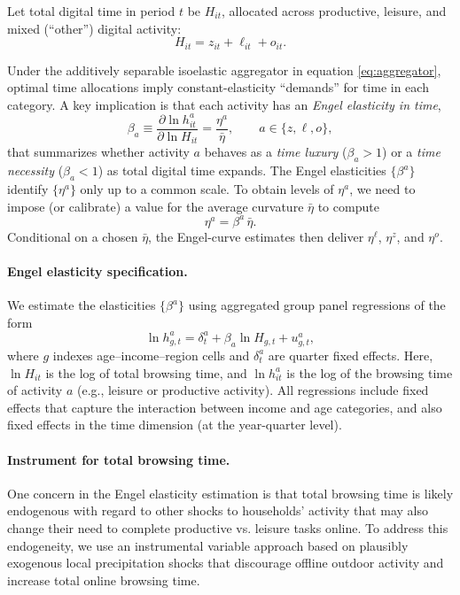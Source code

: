 \documentclass[12pt]{article}
\begin{document}
Let total digital time in period $t$ be $H_{it}$, allocated across productive, leisure, and mixed
(``other'') digital activity:
\begin{equation}
    H_{it} = z_{it} + \ell_{it} + o_{it}.
\end{equation}

Under the additively separable isoelastic aggregator in equation  \ref{eq:aggregator}, optimal time allocations imply
constant-elasticity ``demands'' for time in each category. A key implication is that each activity
has an \emph{Engel elasticity in time},
\begin{equation}
    \beta_a \equiv \frac{\partial \ln h^a_{it}}{\partial     \ln H_{it}} = \frac{\eta^a}{\bar{\eta}}, 
    \qquad a \in \{z,\ell,o\},
\end{equation}
that summarizes whether activity $a$ behaves as a \emph{time luxury} ($\beta_a > 1$) or a
\emph{time necessity} ($\beta_a < 1$) as total digital time expands. The Engel elasticities $\{\beta^a\}$ identify $\{\eta^a\}$ only up to a common scale. To obtain {levels} of $\eta^a$, we need to impose (or calibrate) a
value for the average curvature $\bar{\eta}$ to compute
\begin{equation}
    \eta^a = \beta^a \,\bar{\eta}.
\end{equation}
Conditional on a chosen $\bar{\eta}$, the Engel-curve estimates then deliver $\eta^\ell$, $\eta^z$, and $\eta^o$.


\paragraph{Engel elasticity specification.} We estimate the elasticities $\{\beta^a\}$ using aggregated group panel regressions of the form
\begin{equation} \label{eq:engeleq}
    \ln h^a_{g,t} = \delta^a_t + \beta_a \ln H_{g,t} + u^a_{g,t},
\end{equation}
where $g$ indexes age--income--region cells and $\delta^a_t$ are quarter fixed effects. Here, $\ln H_{it}$ is the log of total browsing time, and $\ln h_{it}^{a}$ is the log of the browsing time of activity $a$ (e.g., leisure or productive activity).  All regressions include fixed effects that capture the interaction between income and age categories, and also fixed effects in the time dimension (at the year-quarter level).

\paragraph{Instrument for total browsing time.} One concern in the Engel elasticity estimation is that total browsing time is likely endogenous with regard to other shocks to households' activity that may also change their need to complete productive vs. leisure tasks online. To address this endogeneity, we use an instrumental variable approach based on plausibly exogenous local precipitation shocks that discourage offline outdoor activity and increase total online browsing time. 
\end{document}
